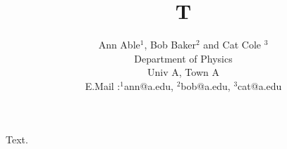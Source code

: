 \documentclass[10pt,twocolumn]{IEEEtran}
\title{T}
\author{{Ann Able$^1$, Bob Baker$^2$ and Cat Cole $^3$ }\\
Department of Physics\\
Univ A, Town A\\
E.Mail :$^1$ann@a.edu, $^2$bob@a.edu,
 $^3$cat@a.edu}
\begin{document}
\maketitle
Text.
\end{document}

